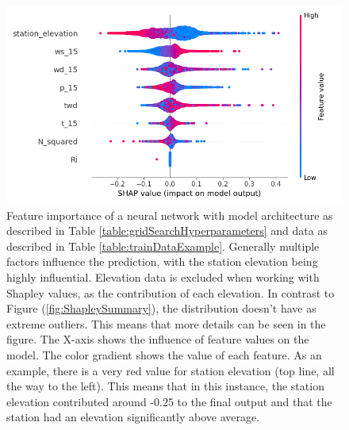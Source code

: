 \begin{figure}
    \centering
    \includegraphics[scale = 0.6]{Figures/shap_plots/summary_plot_190924_.png}
    \caption[Summary feature importance of a neural network using a larger distribution of data.]{Feature importance of a neural network with model architecture as described in Table \ref{table:gridSearchHyperparameters} and data as described in Table \ref{table:trainDataExample}. Generally multiple factors influence the prediction, with the station elevation being highly influential. Elevation data is excluded when working with Shapley values, as the contribution of each elevation. In contrast to Figure (\ref{fig:ShapleySummary}), the distribution doesn't have as extreme outliers. This means that more details can be seen in the figure. The X-axis shows the influence of feature values on the model. The color gradient shows the value of each feature. As an example, there is a very red value for station elevation (top line, all the way to the left). This means that in this instance, the station elevation contributed around -0.25 to the final output and that the station had an elevation significantly above average.}
    \label{fig:ShapleySummary2}
\end{figure}


